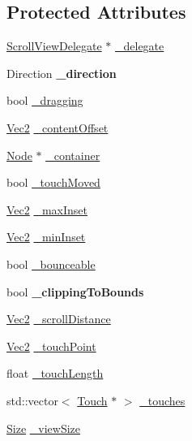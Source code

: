 \subsection*{Protected Attributes}
\begin{DoxyCompactItemize}
\item 
\hyperlink{classScrollViewDelegate}{Scroll\+View\+Delegate} $\ast$ \hyperlink{classScrollView_a34ebfd00cb6aa44524e6330104de951c}{\+\_\+delegate}
\item 
\mbox{\label{classScrollView_a23fc2df134b5ea936731f86d4dab4e0c}} 
Direction {\bfseries \+\_\+direction}
\item 
bool \hyperlink{classScrollView_a273f65143fd85a5059b6542f03394817}{\+\_\+dragging}
\item 
\hyperlink{classVec2}{Vec2} \hyperlink{classScrollView_a33f263e50cdf70ec078e863b49ecbaf9}{\+\_\+content\+Offset}
\item 
\hyperlink{classNode}{Node} $\ast$ \hyperlink{classScrollView_a81d46625d9c9566a8ffb58c2b7a16f19}{\+\_\+container}
\item 
bool \hyperlink{classScrollView_af8fbe879a0228e957ee32265b5123e2c}{\+\_\+touch\+Moved}
\item 
\hyperlink{classVec2}{Vec2} \hyperlink{classScrollView_a9d3fd49fe5409afadcbc3fd72e458472}{\+\_\+max\+Inset}
\item 
\hyperlink{classVec2}{Vec2} \hyperlink{classScrollView_a0765d9e9863c30d05eda4f1e8118e953}{\+\_\+min\+Inset}
\item 
bool \hyperlink{classScrollView_a303fdf5ed50f0a9dc15912669de54b24}{\+\_\+bounceable}
\item 
\mbox{\label{classScrollView_a359b9eca9ea80c8c5156d3eddefeb4d5}} 
bool {\bfseries \+\_\+clipping\+To\+Bounds}
\item 
\hyperlink{classVec2}{Vec2} \hyperlink{classScrollView_a45287113b00b55970d1cfceb860f7101}{\+\_\+scroll\+Distance}
\item 
\hyperlink{classVec2}{Vec2} \hyperlink{classScrollView_a9c087ffb8d2c3b180e9a7ed77fc07f05}{\+\_\+touch\+Point}
\item 
float \hyperlink{classScrollView_aed43981d625e9c19cd9969f71e7825fb}{\+\_\+touch\+Length}
\item 
std\+::vector$<$ \hyperlink{classTouch}{Touch} $\ast$ $>$ \hyperlink{classScrollView_a2cc2133efc670e4b73ea1b2df30fe0e2}{\+\_\+touches}
\item 
\hyperlink{classSize}{Size} \hyperlink{classScrollView_ad4f31d6c396e8487716de175eea55a08}{\+\_\+view\+Size}

\end{DoxyCompactItemize}
